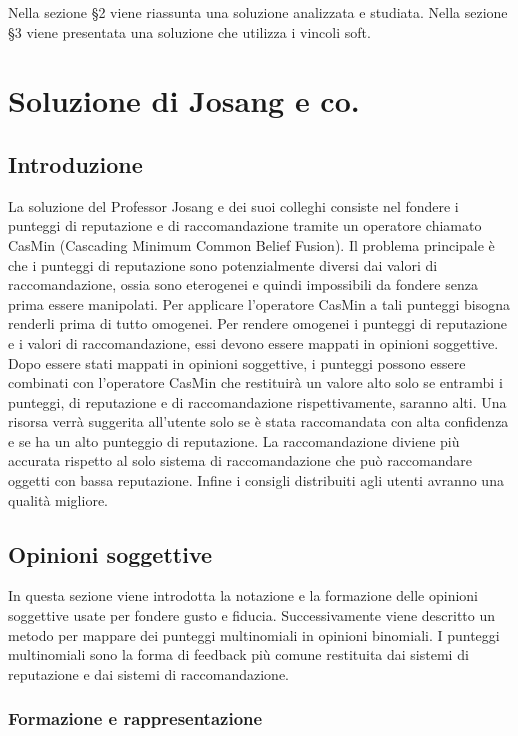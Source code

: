 \documentclass[letterpaper]{article} %
\begin{document}
Nella sezione §2 viene riassunta una soluzione analizzata e studiata.
Nella sezione §3 viene presentata una soluzione che utilizza i vincoli
soft.

\section{Soluzione di Josang e co.}

\subsection{Introduzione}

La soluzione del Professor Josang e dei suoi colleghi consiste nel
fondere i punteggi di reputazione e di raccomandazione tramite un
operatore chiamato CasMin (Cascading Minimum Common Belief Fusion). Il
problema principale è che i punteggi di reputazione sono potenzialmente
diversi dai valori di raccomandazione, ossia sono eterogenei e quindi
impossibili da fondere senza prima essere manipolati. Per applicare
l'operatore CasMin a tali punteggi bisogna renderli prima di tutto
omogenei. Per rendere omogenei i punteggi di reputazione e i valori di
raccomandazione, essi devono essere mappati in opinioni soggettive. Dopo
essere stati mappati in opinioni soggettive, i punteggi possono essere
combinati con l'operatore CasMin che restituirà un valore alto solo se
entrambi i punteggi, di reputazione e di raccomandazione
rispettivamente, saranno alti. Una risorsa verrà suggerita all'utente
solo se è stata raccomandata con alta confidenza e se ha un alto
punteggio di reputazione. La raccomandazione diviene più accurata
rispetto al solo sistema di raccomandazione che può raccomandare
oggetti con bassa reputazione. Infine i consigli distribuiti agli utenti
avranno una qualità migliore.

\subsection{Opinioni soggettive}

In questa sezione viene introdotta la notazione e la formazione delle
opinioni soggettive usate per fondere gusto e fiducia. Successivamente
viene descritto un metodo per mappare dei punteggi multinomiali in
opinioni binomiali. I punteggi multinomiali sono la forma di feedback più comune
restituita dai sistemi di reputazione e dai sistemi di raccomandazione.

\subsubsection{Formazione e rappresentazione}
\end{document}
